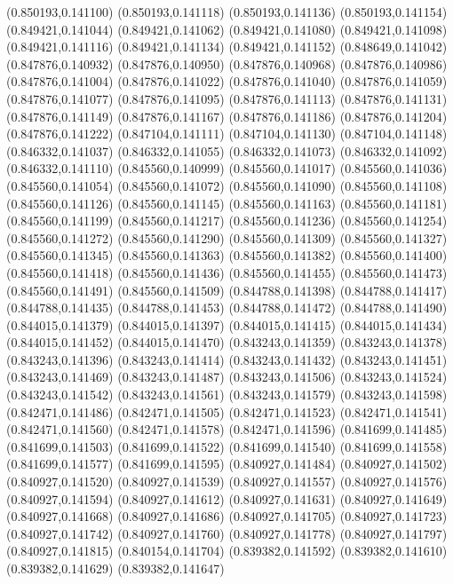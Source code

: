 (0.850193,0.141100)
(0.850193,0.141118)
(0.850193,0.141136)
(0.850193,0.141154)
(0.849421,0.141044)
(0.849421,0.141062)
(0.849421,0.141080)
(0.849421,0.141098)
(0.849421,0.141116)
(0.849421,0.141134)
(0.849421,0.141152)
(0.848649,0.141042)
(0.847876,0.140932)
(0.847876,0.140950)
(0.847876,0.140968)
(0.847876,0.140986)
(0.847876,0.141004)
(0.847876,0.141022)
(0.847876,0.141040)
(0.847876,0.141059)
(0.847876,0.141077)
(0.847876,0.141095)
(0.847876,0.141113)
(0.847876,0.141131)
(0.847876,0.141149)
(0.847876,0.141167)
(0.847876,0.141186)
(0.847876,0.141204)
(0.847876,0.141222)
(0.847104,0.141111)
(0.847104,0.141130)
(0.847104,0.141148)
(0.846332,0.141037)
(0.846332,0.141055)
(0.846332,0.141073)
(0.846332,0.141092)
(0.846332,0.141110)
(0.845560,0.140999)
(0.845560,0.141017)
(0.845560,0.141036)
(0.845560,0.141054)
(0.845560,0.141072)
(0.845560,0.141090)
(0.845560,0.141108)
(0.845560,0.141126)
(0.845560,0.141145)
(0.845560,0.141163)
(0.845560,0.141181)
(0.845560,0.141199)
(0.845560,0.141217)
(0.845560,0.141236)
(0.845560,0.141254)
(0.845560,0.141272)
(0.845560,0.141290)
(0.845560,0.141309)
(0.845560,0.141327)
(0.845560,0.141345)
(0.845560,0.141363)
(0.845560,0.141382)
(0.845560,0.141400)
(0.845560,0.141418)
(0.845560,0.141436)
(0.845560,0.141455)
(0.845560,0.141473)
(0.845560,0.141491)
(0.845560,0.141509)
(0.844788,0.141398)
(0.844788,0.141417)
(0.844788,0.141435)
(0.844788,0.141453)
(0.844788,0.141472)
(0.844788,0.141490)
(0.844015,0.141379)
(0.844015,0.141397)
(0.844015,0.141415)
(0.844015,0.141434)
(0.844015,0.141452)
(0.844015,0.141470)
(0.843243,0.141359)
(0.843243,0.141378)
(0.843243,0.141396)
(0.843243,0.141414)
(0.843243,0.141432)
(0.843243,0.141451)
(0.843243,0.141469)
(0.843243,0.141487)
(0.843243,0.141506)
(0.843243,0.141524)
(0.843243,0.141542)
(0.843243,0.141561)
(0.843243,0.141579)
(0.843243,0.141598)
(0.842471,0.141486)
(0.842471,0.141505)
(0.842471,0.141523)
(0.842471,0.141541)
(0.842471,0.141560)
(0.842471,0.141578)
(0.842471,0.141596)
(0.841699,0.141485)
(0.841699,0.141503)
(0.841699,0.141522)
(0.841699,0.141540)
(0.841699,0.141558)
(0.841699,0.141577)
(0.841699,0.141595)
(0.840927,0.141484)
(0.840927,0.141502)
(0.840927,0.141520)
(0.840927,0.141539)
(0.840927,0.141557)
(0.840927,0.141576)
(0.840927,0.141594)
(0.840927,0.141612)
(0.840927,0.141631)
(0.840927,0.141649)
(0.840927,0.141668)
(0.840927,0.141686)
(0.840927,0.141705)
(0.840927,0.141723)
(0.840927,0.141742)
(0.840927,0.141760)
(0.840927,0.141778)
(0.840927,0.141797)
(0.840927,0.141815)
(0.840154,0.141704)
(0.839382,0.141592)
(0.839382,0.141610)
(0.839382,0.141629)
(0.839382,0.141647)
